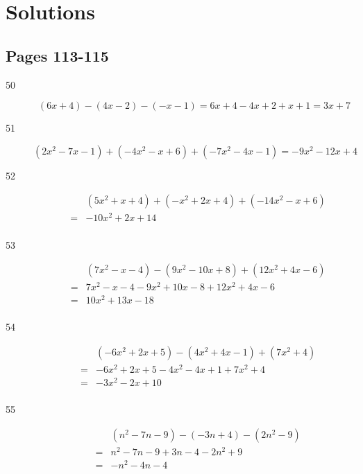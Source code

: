 \documentclass[fleqn,addpoints]{exam}
\begin{document}
\ifprintanswers

\section{Solutions}

\subsection{Pages 113-115}

\begin{description}

\item[50]
\[ (6x + 4) - (4x - 2) - (-x - 1) = 6x + 4 - 4x + 2 + x + 1  =  3x + 7 \]

\item[51]
\[ (2x^2 - 7x - 1) + (-4x^2 - x + 6) + (-7x^2 - 4x - 1) = -9x^2 -12x + 4 \]

\item[52]
\begin{eqnarray*}
&& (5x^2 + x + 4) + (-x^2 + 2x + 4) + (-14x^2 - x + 6)  \\
&=& -10x^2 + 2x + 14 \\
\end{eqnarray*}

\item[53]
\begin{eqnarray*}
&& (7x^2 - x - 4) - (9x^2 - 10x + 8) + (12x^2 + 4x - 6) \\
&=&  7x^2 - x - 4 - 9x^2 + 10x - 8 + 12x^2 + 4x - 6 \\
&=& 10x^2 + 13x -18 \\
\end{eqnarray*}

\item[54]
\begin{eqnarray*}
 && (-6x^2 + 2x  +5) - (4x^2 + 4x - 1) + (7x^2 + 4) \\
 &=& -6x^2 + 2x  + 5 - 4x^2 - 4x + 1 + 7x^2 + 4 \\
 &=& -3x^2 - 2x + 10 \\
\end{eqnarray*}

\item[55]
\begin{eqnarray*}
&& (n^2 - 7n - 9) - (-3n + 4) - (2n^2 - 9) \\
&=&  n^2 - 7n - 9 + 3n - 4 - 2n^2 + 9 \\
&=& -n^2 -4n -4 \\
\end{eqnarray*}


\end{description}
\end{document}
